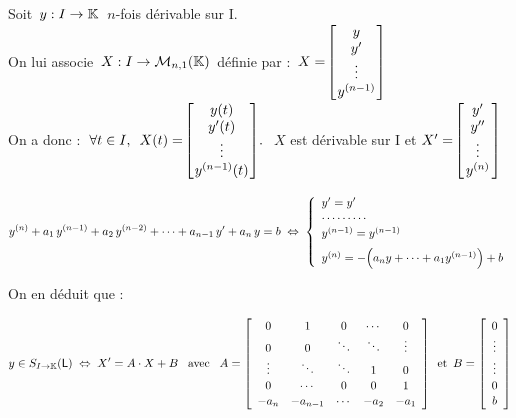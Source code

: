 Soit \(\,y:I\to \mathbb{K}\:\) $n$-fois dérivable sur I.\vspace{-0.3cm}\\
On lui associe \(\,X:I\to \mathcal{M}_{n,1}(\mathbb{K})\,\) définie par : \(\, X=\!\arraycolsep=0.03cm\def\arraystretch{1}\left[
\begin{array}{c}
    y\\
    y'\\
    \vdots\\
    y^{(n-1)}
\end{array}
\right]\)\\
On a donc : \(\;\forall t\in I,\ \,X(t)=\!\arraycolsep=0.03cm\def\arraystretch{1}\left[
    \begin{array}{c}
        y(t)\\
        y'(t)\\
        \vdots\\
        y^{(n-1)}(t)
    \end{array}
    \right]\!.\ \) $X$ est dérivable sur I et \(  X'=\!\arraycolsep=0.05cm\def\arraystretch{1}\left[
        \begin{array}{c}
            y'\\
            y''\\
            \vdots\\
            y^{(n)}
        \end{array}
        \right]\)

\vspace{0.5cm}

\[y^{(n)}+a_1\,y^{(n-1)}+a_2\,y^{(n-2)}+\cdots+a_{n-1}\,y'+a_n\,y=b\; \Leftrightarrow\; \left\{\def\arraystretch{1.1}
\begin{array}{l}
    y'=y'\\
    \cdots\cdots\cdots\\
    y^{(n-1)}=y^{(n-1)}\vspace{0.2cm}\\
    y^{(n)}=-\Bigl(a_ny+\cdots+a_1y^{(n-1)}\Bigr)+b
\end{array}
 \right.\]\vspace{0.5cm}

On en déduit que : \vspace{-1cm}

\[y\in S_{I\to \KK}(\mathsf{L})\;\Leftrightarrow \; X'=A\cdot X+B \quad\! \text{avec}\quad\!  A=\left[
\begin{array}{ccccc}
    0 & 1 & 0 & \cdots & 0\\
    0 & 0 & \ddots & \ddots & \vdots \\
    \vdots & \ddots & \ddots & 1 & 0 \\
    0 & \cdots & 0 & 0 & 1 \\
    -a_n & -a_{n-1} & \cdots & -a_2 & -a_1 
\end{array}
\right]\, \text{ et }\, B=\left[
\begin{array}{c}
    0\\
    \vdots\\
    \vdots\\
    0\\
    b   
\end{array}
\right]\]

